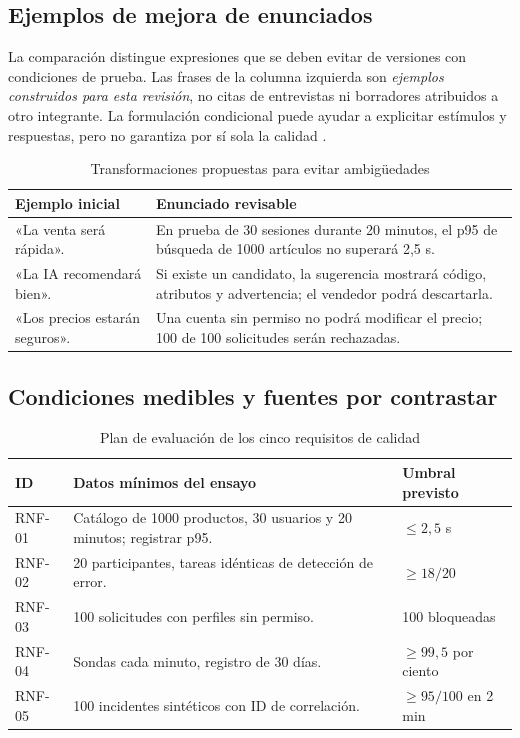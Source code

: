 \subsection{Ejemplos de mejora de enunciados}
La comparación distingue expresiones que se deben evitar de versiones con condiciones de prueba. Las frases de la columna izquierda son \emph{ejemplos construidos para esta revisión}, no citas de entrevistas ni borradores atribuidos a otro integrante. La formulación condicional puede ayudar a explicitar estímulos y respuestas, pero no garantiza por sí sola la calidad \cite{montgomery2022,iso29148}.
\begin{table}[!ht]
\centering\scriptsize
\caption{Transformaciones propuestas para evitar ambigüedades}
\label{tab:mejoras14}
\begin{tabularx}{\columnwidth}{@{}P{1.15cm}Y@{}}
\toprule Ejemplo inicial & Enunciado revisable\\\midrule
«La venta será rápida». & En prueba de 30 sesiones durante 20 minutos, el p95 de búsqueda de 1000 artículos no superará 2,5 s.\\
«La IA recomendará bien». & Si existe un candidato, la sugerencia mostrará código, atributos y advertencia; el vendedor podrá descartarla.\\
«Los precios estarán seguros». & Una cuenta sin permiso no podrá modificar el precio; 100 de 100 solicitudes serán rechazadas.\\
\bottomrule
\end{tabularx}
\end{table}

\subsection{Condiciones medibles y fuentes por contrastar}
\begin{table}[!ht]
\centering\scriptsize
\caption{Plan de evaluación de los cinco requisitos de calidad}
\label{tab:rnf14}
\begin{tabularx}{\columnwidth}{@{}P{0.72cm}Y P{1.05cm}@{}}
\toprule ID & Datos mínimos del ensayo & Umbral previsto\\\midrule
RNF-01 & Catálogo de 1000 productos, 30 usuarios y 20 minutos; registrar p95. & $\leq 2{,}5$ s\\
RNF-02 & 20 participantes, tareas idénticas de detección de error. & $\geq 18/20$\\
RNF-03 & 100 solicitudes con perfiles sin permiso. & 100 bloqueadas\\
RNF-04 & Sondas cada minuto, registro de 30 días. & $\geq 99{,}5$ por ciento\\
RNF-05 & 100 incidentes sintéticos con ID de correlación. & $\geq 95/100$ en 2 min\\
\bottomrule
\end{tabularx}
\end{table}

